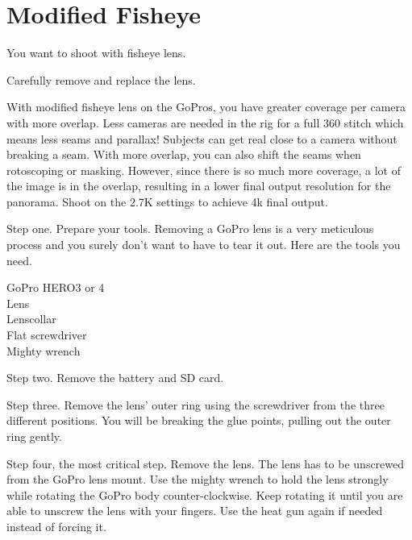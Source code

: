 \chapter{Modified Fisheye}
\pagecolor{white}
\label{chap:26}
\begin{fullwidth}

\problem

{\large You want to shoot with fisheye lens. \par}


\solution

{\large Carefully remove and replace the lens. \par}

With modified fisheye lens on the GoPros, you have greater coverage per camera with more overlap. Less cameras are needed in the rig for a full 360 stitch which means less seams and parallax! Subjects can get real close to a camera without breaking a seam. With more overlap, you can also shift the seams when rotoscoping or masking. However, since there is so much more coverage, a lot of the image is in the overlap, resulting in a lower final output resolution for the panorama. Shoot on the 2.7K settings to achieve 4k final output. 


Step one. Prepare your tools. Removing a GoPro lens is a very meticulous process and you surely don't want to have to tear it out. Here are the tools you need. 

GoPro HERO3 or 4
\\
Lens
\\
Lenscollar
\\
Flat screwdriver
\\
Mighty wrench


Step two. Remove the battery and SD card.


Step three. Remove the lens' outer ring using the screwdriver from the three different positions. You will be breaking the glue points, pulling out the outer ring gently.


Step four, the most critical step. Remove the lens. The lens has to be unscrewed from the GoPro lens mount. Use the mighty wrench to hold the lens strongly while rotating the GoPro body counter-clockwise. Keep rotating it until you are able to unscrew the lens with your fingers. Use the heat gun again if needed instead of forcing it.


\end{fullwidth}
